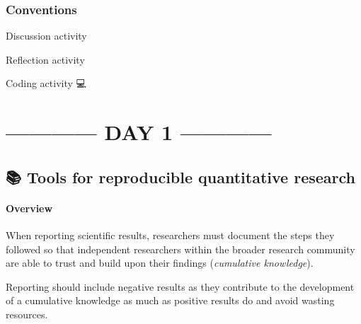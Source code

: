 \documentclass[
  letterpaper,
  DIV=11,
  numbers=noendperiod,
  oneside]{scrreprt}
\begin{document}
\hypertarget{conventions}{%
\section{Conventions}\label{conventions}}

Discussion activity {💬}

Reflection activity {💭}

Coding activity {💻}

\part{------------ DAY 1 ------------}

\hypertarget{tools-for-reproducible-quantitative-research}{%
\chapter{\texorpdfstring{{📚} Tools for reproducible quantitative
research}{📚 Tools for reproducible quantitative research}}\label{tools-for-reproducible-quantitative-research}}

\hypertarget{overview}{%
\subsection{Overview}\label{overview}}

When reporting scientific results, researchers must document the steps
they followed so that independent researchers within the broader
research community are able to trust and build upon their findings
(\emph{cumulative knowledge}).

\begin{tcolorbox}[enhanced jigsaw, colbacktitle=quarto-callout-important-color!10!white, titlerule=0mm, breakable, opacityback=0, opacitybacktitle=0.6, left=2mm, coltitle=black, colback=white, title=\textcolor{quarto-callout-important-color}{\faExclamation}\hspace{0.5em}{Important}, rightrule=.15mm, colframe=quarto-callout-important-color-frame, toprule=.15mm, bottomtitle=1mm, toptitle=1mm, arc=.35mm, bottomrule=.15mm, leftrule=.75mm]
Reporting should include negative results as they contribute to the
development of a cumulative knowledge as much as positive results do and
avoid wasting resources.
\end{tcolorbox}
\end{document}
